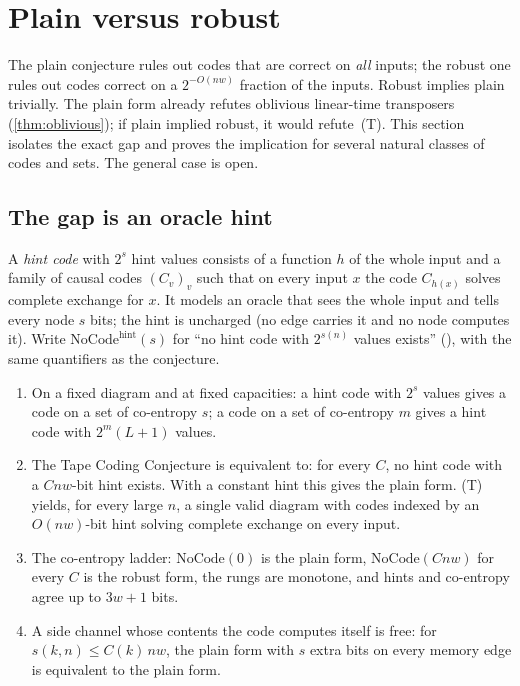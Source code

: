\section{Plain versus robust}\label{sec:plainrobust}

The plain conjecture rules out codes that are correct on \emph{all} inputs; the robust one rules out
codes correct on a $2^{-O(nw)}$ fraction of the inputs. Robust implies plain trivially. The plain
form already refutes oblivious linear-time transposers (\cref{thm:oblivious}); if plain implied
robust, it would refute~(T). This section isolates the exact gap and proves the implication for
several natural classes of codes and sets. The general case is open.

\subsection{The gap is an oracle hint}

A \emph{hint code} with $2^s$ hint values consists of a function $h$ of the whole input and a family
of causal codes $(C_v)_v$ such that on every input $x$ the code $C_{h(x)}$ solves complete exchange
for $x$. It models an oracle that sees the whole input and tells every node $s$ bits; the hint is
uncharged (no edge carries it and no node computes it). Write $\mathrm{NoCode}^{\mathrm{hint}}(s)$
for ``no hint code with $2^{s(n)}$ values exists'' (), with the same
quantifiers as the conjecture.

\begin{theorem}\label{thm:hint}
\begin{enumerate}[label=(\alph*)]
\item On a fixed diagram and at fixed capacities: a hint code with $2^s$ values gives a code on a set
of co-entropy $s$; a code on a set of co-entropy $m$ gives a hint code with $2^m(L+1)$ values.
\item The Tape Coding Conjecture is equivalent to: for every $C$, no hint code with a $Cnw$-bit
hint exists. With a constant hint this gives the plain form. (T) yields, for every large $n$, a single
valid diagram with codes indexed by an $O(nw)$-bit hint solving complete exchange on every input.
\item The co-entropy ladder: $\mathrm{NoCode}(0)$ is the plain form, $\mathrm{NoCode}(Cnw)$ for every
$C$ is the robust form, the rungs are monotone, and hints and co-entropy agree up to $3w+1$ bits.
\item A side channel whose contents the code computes itself is free: for $s(k,n)\le C(k)\,nw$, the
plain form with $s$ extra bits on every memory edge is equivalent to the plain form.
\end{enumerate}
\end{theorem}


